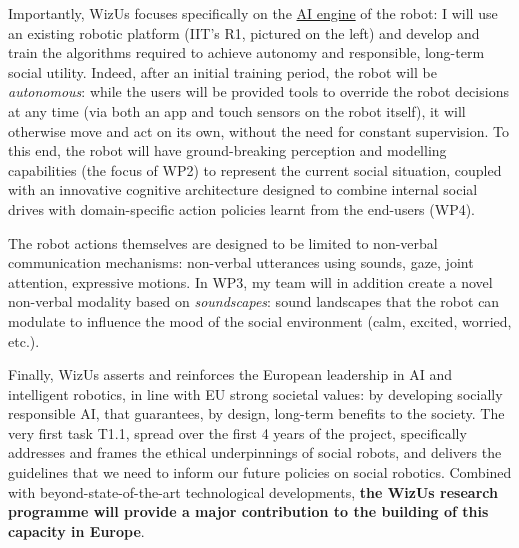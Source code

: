 \documentclass[11pt,a4paper]{report}
\newcommand{\project}{WizUs\xspace}
\begin{document}
\begin{figure}
    \label{fig|R1}
\end{figure}

Importantly, \project focuses specifically on the \ul{AI engine} of the robot: I
will use an existing robotic platform (IIT's R1, pictured on the left) and
develop and train the algorithms required to achieve autonomy and responsible,
long-term social utility. Indeed, after an initial training period, the robot will
be \emph{autonomous}: while the users will be provided tools to override
the robot decisions at any time (via both an app and touch sensors on the robot
itself), it will otherwise move and act on its own, without the need for
constant supervision. To this end, the robot will have ground-breaking
perception and modelling capabilities (the focus of WP2) to represent the
current social situation, coupled with an innovative cognitive architecture
designed to combine internal social drives with domain-specific action policies
learnt from the end-users (WP4).

The robot actions themselves are designed to be limited to non-verbal
communication mechanisms: non-verbal utterances using sounds, gaze, joint
attention, expressive motions. In WP3, my team will in addition create a novel
non-verbal modality based on \emph{soundscapes}: sound landscapes that the robot
can modulate to influence the mood of the social environment (calm, excited,
worried, etc.).

Finally, \project asserts and reinforces the European leadership in AI and
intelligent robotics, in line with EU strong societal values: by developing
socially responsible AI, that guarantees, by design, long-term benefits to the
society. The very first task T1.1, spread over the first 4 years of the project,
specifically addresses and frames the ethical underpinnings of social robots,
and delivers the guidelines that we need to inform our future policies on social
robotics. Combined with beyond-state-of-the-art technological developments,
\textbf{the \project research programme will provide a major contribution to the
building of this capacity in Europe}. 
\end{document}
